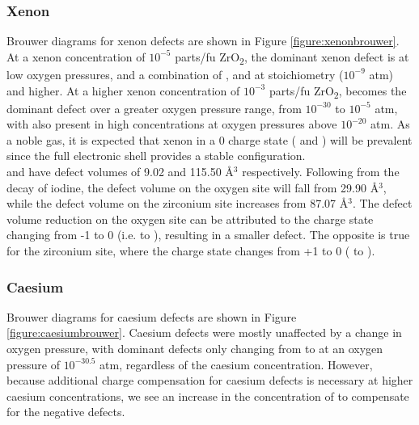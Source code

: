 \documentclass[11pt,a4paper]{article}
\newcommand{\zirconia}{ZrO\textsubscript{2}}
\begin{document}
\subsubsection*{Xenon}

Brouwer diagrams for xenon defects are shown in Figure \ref{figure:xenonbrouwer}. At a xenon concentration of $10^{-5}$ parts/fu \zirconia , the dominant xenon defect is  at low oxygen pressures, and a combination of ,  and  at stoichiometry ($10^{-9}$ atm) and higher. At a higher xenon concentration of $10^{-3}$ parts/fu \zirconia ,  becomes the dominant defect over a greater oxygen pressure range, from $10^{-30}$ to $10^{-5}$ atm, with  also present in high concentrations at oxygen pressures above $10^{-20}$ atm. As a noble gas, it is expected that xenon in a 0 charge state ( and ) will be prevalent since the full electronic shell provides a stable configuration. \\

 and  have defect volumes of 9.02 and 115.50 \r{A}$^{3}$ respectively. Following from the decay of iodine, the defect volume on the oxygen site will fall from 29.90 \r{A}$^{3}$, while the defect volume on the zirconium site increases from 87.07 \r{A}$^{3}$. The defect volume reduction on the oxygen site can be attributed to the charge state changing from -1 to 0 (i.e.  to ), resulting in a smaller defect. The opposite is true for the zirconium site, where the charge state changes from +1 to 0 ( to ).

\subsubsection*{Caesium}

Brouwer diagrams for caesium defects are shown in Figure \ref{figure:caesiumbrouwer}. Caesium defects were mostly unaffected by a change in oxygen pressure, with dominant defects only changing from  to  at an oxygen pressure of $10^{-30.5}$ atm, regardless of the caesium concentration. However, because additional charge compensation for caesium defects is necessary at higher caesium concentrations, we see an increase in the concentration of  to compensate for the negative  defects. \\
\end{document}
